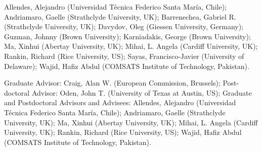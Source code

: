 \documentclass[11pt]{article}
\begin{document}
Allendes, Alejandro (Universidad T\'ecnica Federico Santa
Mar\'ia, Chile); 
Andriamaro, Gaelle (Strathclyde University, UK); 
Barrenechea, Gabriel R. (Strathclyde University, UK); 
Davydov, Oleg (Giessen University, Germany); 
Guzman, Johnny (Brown University); 
Karniadakis, George (Brown University); 
Ma, Xinhui (Abertay University, UK); 
Mihai, L. Angela (Cardiff University, UK); 
Rankin, Richard (Rice University, US); 
Sayas, Francisco-Javier (University of Delaware); 
Wajid, Hafiz Abdul (COMSATS Institute of Technology, Pakistan).

Graduate Advisor: Craig, Alan W. (European Commission, Brussels); Post-doctoral
Advisor: Oden, John T. (University of Texas at Austin, US); Graduate and
Postdoctoral Advisors and Advisees: Allendes, Alejandro (Universidad T\'ecnica
Federico Santa Mar\'ia, Chile); Andriamaro, Gaelle (Strathclyde University, UK);
Ma, Xinhui (Abertay University, UK); Mihai, L. Angela (Cardiff University, UK);
Rankin, Richard (Rice University, US); Wajid, Hafiz Abdul (COMSATS Institute of
Technology, Pakistan).
\end{document}
